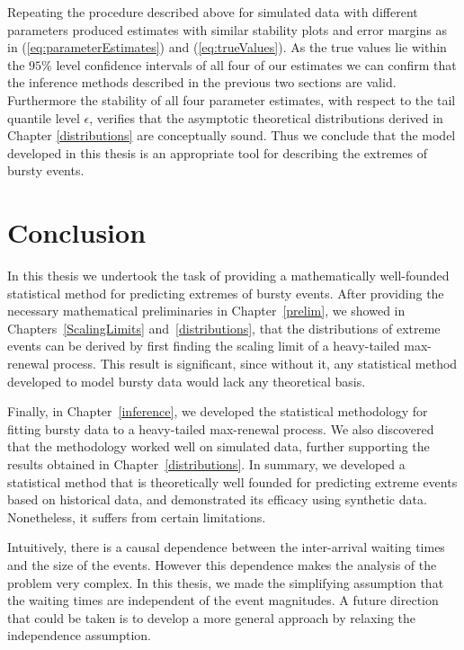 \documentclass[honours,12pt]{unswthesis}
\newcommand{\1}{\mathbf 1}
\numberwithin{equation}{section}
\theoremstyle{definition}
\theoremstyle{remark}
\begin{document}
Repeating the procedure described above for simulated data with different parameters produced estimates with similar stability plots and error margins as in (\ref{eq:parameterEstimates}) and (\ref{eq:trueValues}). As the true values lie within the $95\%$ level confidence intervals of all four of our estimates we can confirm that the inference methods described in the previous two sections are valid. Furthermore the stability of all four parameter estimates, with respect to the tail quantile level $\epsilon$, verifies that the asymptotic theoretical distributions derived in Chapter \ref{distributions} are conceptually sound. Thus we conclude that the model developed in this thesis is an appropriate tool for describing the extremes of bursty events.
\chapter{Conclusion}
In this thesis we undertook the task of providing a mathematically well-founded statistical method for predicting extremes of bursty events. %
After providing the necessary mathematical preliminaries in Chapter~\ref{prelim}, we showed in Chapters~\ref{ScalingLimits} and~\ref{distributions}, that the distributions of extreme events can be derived by first finding the scaling limit of a heavy-tailed max-renewal process. This result is significant, since without it, any statistical method developed to model bursty data would lack any theoretical basis.

Finally, in Chapter~\ref{inference}, we developed the statistical methodology for fitting bursty data to a heavy-tailed max-renewal process. We also discovered that the methodology worked well on simulated data, further supporting the results obtained in Chapter~\ref{distributions}. In summary, we developed a statistical method that is theoretically well founded for predicting extreme events based on historical data, and demonstrated its efficacy using synthetic data. Nonetheless, it suffers from certain limitations.

Intuitively, there is a causal dependence between the inter-arrival waiting times and the size of the events. However this dependence makes the analysis of the problem very complex. In this thesis, we made the simplifying assumption that the waiting times are independent of the event magnitudes. A future direction that could be taken is to develop a more general approach by relaxing the independence assumption. 
\end{document}
